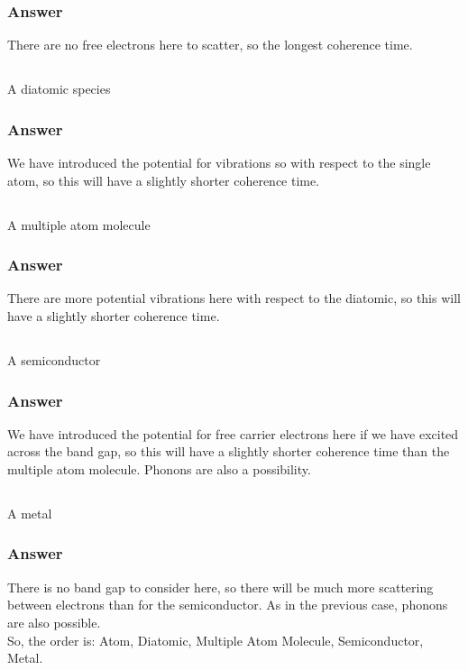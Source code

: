\documentclass[12pt]{article}
\begin{document}
\subsubsection{Answer}
There are no free electrons here to scatter, so the longest coherence time.
\subsection{}
A diatomic species
\subsubsection{Answer}
We have introduced the potential for vibrations so with respect to the single atom, so this will have a slightly shorter coherence time.
\subsection{}
A multiple atom molecule
\subsubsection{Answer}
There are more potential vibrations here with respect to the diatomic, so this will have a slightly shorter coherence time.
\subsection{}
A semiconductor
\subsubsection{Answer}
We have introduced the potential for free carrier electrons here if we have excited across the band gap, so this will have a slightly shorter coherence time than the multiple atom molecule. Phonons are also a possibility.
\subsection{}
A metal
\subsubsection{Answer}
There is no band gap to consider here, so there will be much more scattering between electrons than for the semiconductor. As in the previous case, phonons are also possible.\\
So, the order is: Atom, Diatomic, Multiple Atom Molecule, Semiconductor, Metal.

\section{}
\end{document}
